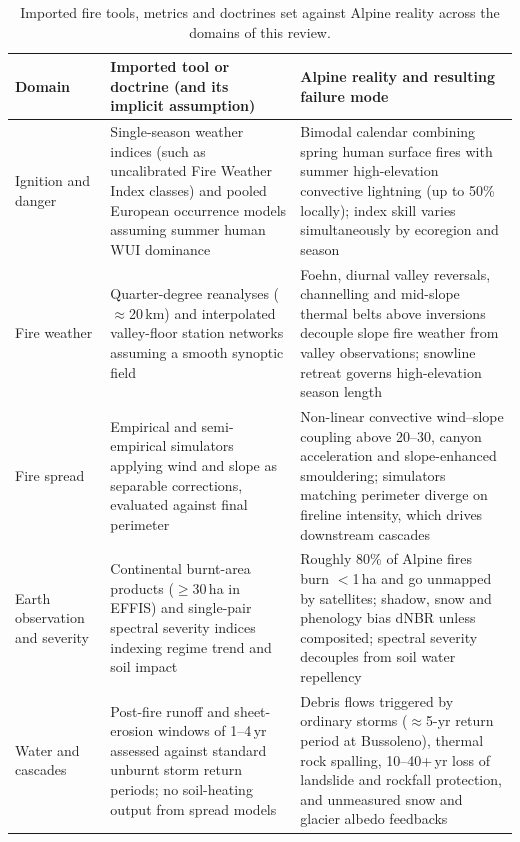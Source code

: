 \documentclass[11pt,a4paper]{article}
\begin{document}
\begin{table}[htbp]
\centering
\footnotesize
\setlength{\tabcolsep}{4pt}
\renewcommand{\arraystretch}{1.15}
\caption{Imported fire tools, metrics and doctrines set against Alpine reality across the domains of this review.}
\label{tab:contrast}
\begin{tabularx}{\textwidth}{@{}>{\raggedright\arraybackslash}p{2.2cm} >{\raggedright\arraybackslash}X >{\raggedright\arraybackslash}X@{}}
\toprule
\textbf{Domain} & \textbf{Imported tool or doctrine (and its implicit assumption)} & \textbf{Alpine reality and resulting failure mode} \\
\midrule
Ignition and danger & Single-season weather indices (such as uncalibrated Fire Weather Index classes) and pooled European occurrence models assuming summer human WUI dominance & Bimodal calendar combining spring human surface fires with summer high-elevation convective lightning (up to 50\% locally); index skill varies simultaneously by ecoregion and season \\[3pt]
Fire weather & Quarter-degree reanalyses ($\approx$20\,km) and interpolated valley-floor station networks assuming a smooth synoptic field & Foehn, diurnal valley reversals, channelling and mid-slope thermal belts above inversions decouple slope fire weather from valley observations; snowline retreat governs high-elevation season length \\[3pt]
Fire spread & Empirical and semi-empirical simulators applying wind and slope as separable corrections, evaluated against final perimeter & Non-linear convective wind--slope coupling above 20--30\degree{}, canyon acceleration and slope-enhanced smouldering; simulators matching perimeter diverge on fireline intensity, which drives downstream cascades \\[3pt]
Earth observation and severity & Continental burnt-area products ($\ge$30\,ha in EFFIS) and single-pair spectral severity indices indexing regime trend and soil impact & Roughly 80\% of Alpine fires burn $<$1\,ha and go unmapped by satellites; shadow, snow and phenology bias dNBR unless composited; spectral severity decouples from soil water repellency \\[3pt]
Water and cascades & Post-fire runoff and sheet-erosion windows of 1--4\,yr assessed against standard unburnt storm return periods; no soil-heating output from spread models & Debris flows triggered by ordinary storms ($\approx$5-yr return period at Bussoleno), thermal rock spalling, 10--40+\,yr loss of landslide and rockfall protection, and unmeasured snow and glacier albedo feedbacks \\[3pt]

\end{tabularx}
\end{table}
\end{document}
